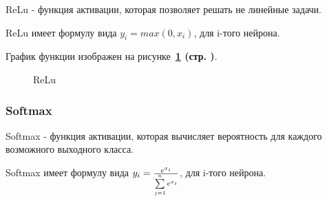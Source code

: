 ReLu - функция активации, которая позволяет решать не линейные задачи.

ReLu имеет формулу вида $y_i = max(0, x_i)$,
для i-того нейрона.

График функции изображен на
рисунке~\textbf{\ref{fig:3_ReLu} (стр. \pageref{fig:3_ReLu})}.

\begin{figure}[!htp]
    \centering
    \caption{ReLu}
    \label{fig:3_ReLu}
\end{figure}

\subsubsection{Softmax}

Softmax - функция активации, которая вычисляет вероятность для каждого возможного выходного класса.

Softmax имеет формулу вида $y_i = { e^{x_i} \over \sum\limits_{j=1}^n e^{x_i} }$,
для i-того нейрона.
